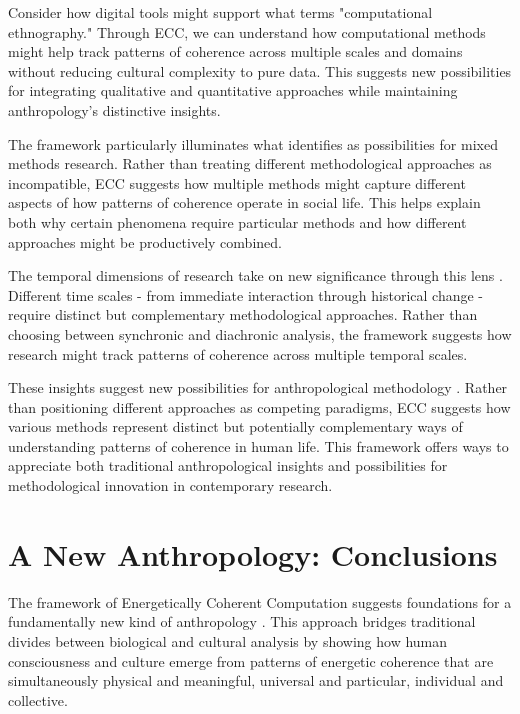 Consider how digital tools might support what \cite{beaulieu2017vectors} terms "computational ethnography." Through ECC, we can understand how computational methods might help track patterns of coherence across multiple scales and domains without reducing cultural complexity to pure data. This suggests new possibilities for integrating qualitative and quantitative approaches while maintaining anthropology's distinctive insights.

The framework particularly illuminates what \cite{ladner2019mixed} identifies as possibilities for mixed methods research. Rather than treating different methodological approaches as incompatible, ECC suggests how multiple methods might capture different aspects of how patterns of coherence operate in social life. This helps explain both why certain phenomena require particular methods and how different approaches might be productively combined.

The temporal dimensions of research take on new significance through this lens \cite{marcus2012multi}. Different time scales - from immediate interaction through historical change - require distinct but complementary methodological approaches. Rather than choosing between synchronic and diachronic analysis, the framework suggests how research might track patterns of coherence across multiple temporal scales.

These insights suggest new possibilities for anthropological methodology \cite{strathern2004partial}. Rather than positioning different approaches as competing paradigms, ECC suggests how various methods represent distinct but potentially complementary ways of understanding patterns of coherence in human life. This framework offers ways to appreciate both traditional anthropological insights and possibilities for methodological innovation in contemporary research.

\section{A New Anthropology: Conclusions}

The framework of Energetically Coherent Computation suggests foundations for a fundamentally new kind of anthropology \cite{rabinow2008marking}. This approach bridges traditional divides between biological and cultural analysis by showing how human consciousness and culture emerge from patterns of energetic coherence that are simultaneously physical and meaningful, universal and particular, individual and collective.

